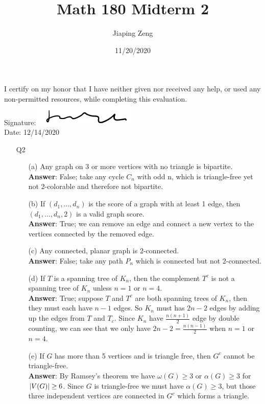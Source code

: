 \documentclass{article}
\title{Math 180 Midterm 2}
\author{Jiaping Zeng}
\date{11/20/2020}
\begin{document}

\newpage
I certify on my honor that I have neither given nor received any help, or used any non-permitted resources, while completing this evaluation.\\
Signature:\includegraphics[width=2in]{signature.png}\\
Date: 12/14/2020

\newpage
\begin{itemize}
      \item [Q2]
            \begin{itemize}
                  \item [(a)] Any graph on 3 or more vertices with no triangle is bipartite.\\
                        \textbf{Answer}: False; take any cycle $C_n$ with odd n, which is triangle-free yet not 2-colorable and therefore not bipartite.
                  \item [(b)] If $(d_1,\ldots,d_n)$ is the score of a graph with at least 1 edge, then $(d_1,\ldots,d_n,2)$ is a valid graph score.\\
                        \textbf{Answer}: True; we can remove an edge and connect a new vertex to the vertices connected by the removed edge.
                  \item [(c)] Any connected, planar graph is 2-connected.\\
                        \textbf{Answer}: False; take any path $P_n$ which is connected but not 2-connected.
                  \item [(d)] If $T$ is a spanning tree of $K_n$, then the complement $T^c$ is not a spanning tree of $K_n$ unless $n=1$ or $n=4$.\\
                        \textbf{Answer}: True; suppose $T$ and $T^c$ are both spanning trees of $K_n$, then they must each have $n-1$ edges. So $K_n$ must has $2n-2$ edges by adding up the edges from $T$ and $T_c$. Since $K_n$ have $\frac{n(n+1)}{2}$ edge by double counting, we can see that we only have $2n-2=\frac{n(n-1)}{2}$ when $n=1$ or $n=4$.
                  \item [(e)] If $G$ has more than 5 vertices and is triangle free, then $G^c$ cannot be triangle-free.\\
                        \textbf{Answer}: By Ramsey's theorem we have $\omega(G)\geq 3$ or $\alpha(G)\geq 3$ for $\abs{V(G)}\geq 6$. Since $G$ is triangle-free we must have $\alpha(G)\geq 3$, but those three independent vertices are connected in $G^c$ which forms a triangle.

\end{itemize}
\end{itemize}
\end{document}
